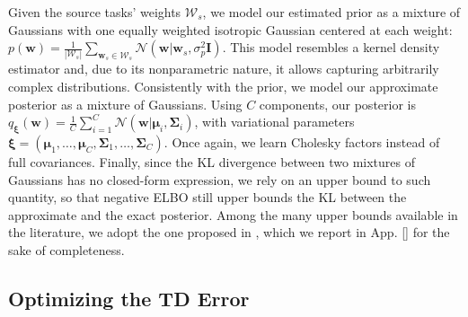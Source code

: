 \documentclass{article}
\newcommand{\abs}[1]{\left\lvert #1 \right\rvert}
\begin{document}
Given the source tasks' weights $\mathcal{W}_s$, we model our estimated prior as a mixture of Gaussians with one equally weighted isotropic Gaussian centered at each weight: $p(\bm{w}) = \frac{1}{\abs{\mathcal{W}_s}}\sum_{\bm{w}_s \in \mathcal{W}_s}\mathcal{N}(\bm{w}|\bm{w}_s,\sigma_p^2\bm{I})$. This model resembles a kernel density estimator \cite{scott2015multivariate} and, due to its nonparametric nature, it allows capturing arbitrarily complex distributions. Consistently with the prior, we model our approximate posterior as a mixture of Gaussians.  Using $C$ components, our posterior is $q_{\bm{\xi}}(\bm{w}) = \frac{1}{C}\sum_{i=1}^C\mathcal{N}(\bm{w}|\bm{\mu}_i,\bm{\Sigma}_i)$, with variational parameters $\bm{\xi} = (\bm{\mu}_1,\dots,\bm{\mu}_C,\bm{\Sigma}_1,\dots,\bm{\Sigma}_C)$. Once again, we learn Cholesky factors instead of full covariances. Finally, since the KL divergence between two mixtures of Gaussians has no closed-form expression, we rely on an upper bound to such quantity, so that negative ELBO still upper bounds the KL between the approximate and the exact posterior. Among the many upper bounds available in the literature, we adopt the one proposed in \cite{hershey2007approximating}, which we report in App. \ref{} for the sake of completeness.

\subsection{Optimizing the TD Error} \label{sec:td}
\end{document}
